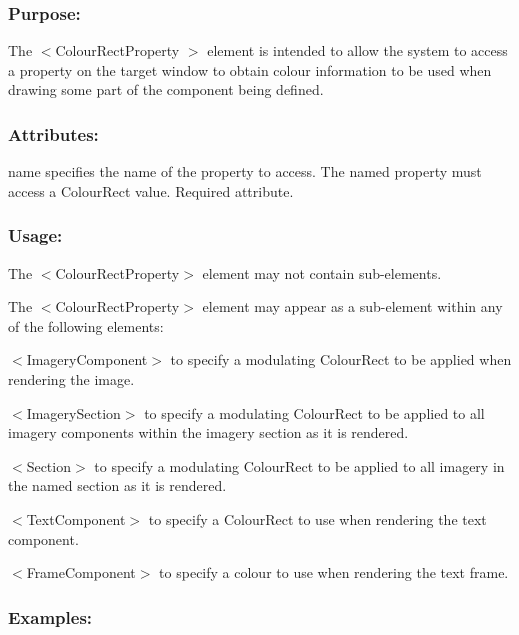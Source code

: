 \hypertarget{fal_element_ref_fal_elem_ref_sec_7_1}{}\subsubsection{Purpose\+:}\label{fal_element_ref_fal_elem_ref_sec_7_1}
The {\ttfamily $<$Colour\+Rect\+Property} $>$ element is intended to allow the system to access a property on the target window to obtain colour information to be used when drawing some part of the component being defined.\hypertarget{fal_element_ref_fal_elem_ref_sec_7_2}{}\subsubsection{Attributes\+:}\label{fal_element_ref_fal_elem_ref_sec_7_2}
\begin{DoxyItemize}
\item {\ttfamily name} specifies the name of the property to access. The named property must access a Colour\+Rect value. Required attribute.\end{DoxyItemize}
\hypertarget{fal_element_ref_fal_elem_ref_sec_7_3}{}\subsubsection{Usage\+:}\label{fal_element_ref_fal_elem_ref_sec_7_3}

\begin{DoxyItemize}
\item The {\ttfamily $<$Colour\+Rect\+Property$>$} element may not contain sub-\/elements.


\item The {\ttfamily $<$Colour\+Rect\+Property$>$} element may appear as a sub-\/element within any of the following elements\+: 
\begin{DoxyItemize}
\item {\ttfamily $<$Imagery\+Component$>$} to specify a modulating Colour\+Rect to be applied when rendering the image. 
\item {\ttfamily $<$Imagery\+Section$>$} to specify a modulating Colour\+Rect to be applied to all imagery components within the imagery section as it is rendered. 
\item {\ttfamily $<$Section$>$} to specify a modulating Colour\+Rect to be applied to all imagery in the named section as it is rendered. 
\item {\ttfamily $<$Text\+Component$>$} to specify a Colour\+Rect to use when rendering the text component. 
\item {\ttfamily $<$Frame\+Component$>$} to specify a colour to use when rendering the text frame. 
\end{DoxyItemize}
\end{DoxyItemize}\hypertarget{fal_element_ref_fal_elem_ref_sec_7_4}{}\subsubsection{Examples\+:}\label{fal_element_ref_fal_elem_ref_sec_7_4}

